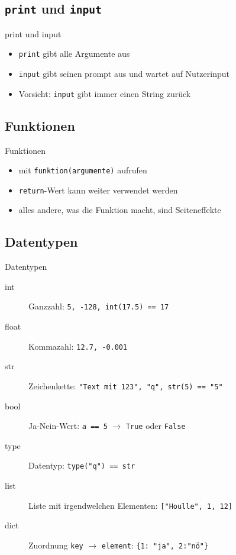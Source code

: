 \subsection{\texttt{print} und \texttt{input}}
\begin{frame}{print und input}
	\begin{itemize}
		\item \texttt{print} gibt alle Argumente aus
		\item \texttt{input} gibt seinen prompt aus und wartet auf Nutzerinput
		\item Vorsicht: \texttt{input} gibt immer einen String zurück
	\end{itemize}
\end{frame}

\subsection{Funktionen}
\begin{frame}{Funktionen}
	\begin{itemize}
		\item mit \texttt{funktion(argumente)} aufrufen
		\item \texttt{return}-Wert kann weiter verwendet werden
		\item alles andere, was die Funktion macht, sind Seiteneffekte
	\end{itemize}
\end{frame}

\subsection{Datentypen}
\begin{frame}{Datentypen}
	\begin{description}
		\item[int] Ganzzahl: \texttt{5, -128, int(17.5) == 17}
		\item[float] Kommazahl: \texttt{12.7, -0.001}
		\item[str] Zeichenkette: \texttt{"Text mit 123", "q", str(5) == "5"}
		\item[bool] Ja-Nein-Wert: \texttt{a == 5} $\to$ \texttt{True} oder \texttt{False}
		\item[type] Datentyp: \texttt{type("q") == str}
		\item[list] Liste mit irgendwelchen Elementen: \texttt{["Houlle", 1, 12]}
		\item[dict] Zuordnung \texttt{key} $\to$ \texttt{element}: \texttt{\{1: "ja", 2:"nö"\}}
	\end{description}
\end{frame}

